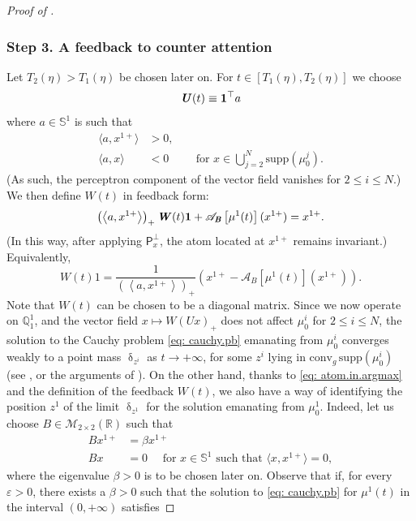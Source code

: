 \documentclass[a4paper,11pt]{article}
\theoremstyle{plain}
\newcommand{\supp}{\mathrm{supp}}
\newcommand{\R}{\mathbb{R}}
\newcommand{\proj}{\bm{\mathsf{P}}^\perp}
\newcommand{\conv}{\mathrm{conv}}
\newcommand{\bW}{\bm{\mathit{W}}}
\newcommand{\bB}{\bm{\mathit{B}}}
\newcommand{\bU}{\bm{\mathit{U}}}
\newcommand{\Q}{\mathbb{Q}}
\renewcommand{\leq}{\leqslant}
\numberwithin{equation}{section}
\begin{document}
\begin{proof}[Proof of ]
\subsubsection*{Step 3. A feedback to counter attention}

Let $T_2(\eta)>T_1(\eta)$ be chosen later on.
For $t\in[T_1(\eta), T_2(\eta)]$ we choose 
$$\bU(t)\equiv {\bf1}^\top a$$ 
where $a\in\mathbb{S}^1$ is such that
\begin{align*}
    \langle a, x^{1+}\rangle&>0,\\
    \langle a,x\rangle&<0\hspace{1cm}\text{for }x\in \bigcup_{j=2}^N \supp(\mu_0^j).
\end{align*}
(As such, the perceptron component of the vector field vanishes for $2\leq i\leq N$.)
We then define $\bW(t)$ in feedback form:
\begin{equation}\label{eq: feedback.W}
    \left(\left\langle a,x^{1+}\right\rangle\right)_+\bW(t){\bf1}+\mathscr{A}_{\bB}\left[\mu^1(t)\right](x^{1+})=x^{1+}.
\end{equation}
(In this way, after applying $\proj_x$, the atom located at $x^{1+}$ remains invariant.)
Equivalently,
\begin{equation*}
    \bW(t)1=\frac{1}{\left(\left\langle a,x^{1+}\right\rangle\right)_+}\left(x^{1+}-\mathscr{A}_{\bB}\left[\mu^1(t)\right](x^{1+})\right).
\end{equation*}
Note that $\bW(t)$ can be chosen to be a diagonal matrix. Since we now operate on $\Q_1^1$, and the vector field $x\mapsto\bW(\bU x)_+$ does not affect $\mu_0^i$ for $2\leq i\leq N$, the solution to the Cauchy problem \eqref{eq: cauchy.pb} emanating from $\mu_0^i$ converges weakly to 
a point mass $\updelta_{z^i}$ as $t\to+\infty$, for some $z^i$ lying in $\conv_g \,\supp(\mu^i_0)$ (see , or the arguments of \cite[Theorem 4.1]{geshkovski2023mathematical}).
On the other hand, thanks to \eqref{eq: atom.in.argmax} and the definition of the feedback $\bW(t)$, we also have a way of identifying the position $z^1$ of the limit $\updelta_{z^1}$ for the solution emanating from  $\mu_0^1$. 
Indeed, let us choose $\bB\in\mathscr{M}_{2\times 2}(\R)$ such that
\begin{align*}
    \bB x^{1+}&=\beta x^{1+}\\ 
    \bB x&=0 \quad\text{ for $x\in\mathbb{S}^1$ such that $\langle x,x^{1+}\rangle=0$},
\end{align*}
where the eigenvalue $\beta>0$ is to be chosen later on. Observe that if, for every $\varepsilon>0$, there exists a $\beta>0$ such that the solution to \eqref{eq: cauchy.pb} for $\mu^1(t)$ in the interval $(0,+\infty)$ satisfies

\end{proof}
\end{document}
